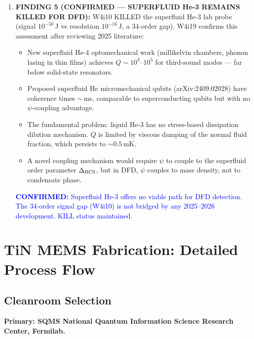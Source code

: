 \documentclass[11pt]{article}
\theoremstyle{remark}
\newcommand{\confirmed}[1]{\textcolor{blue}{\textbf{CONFIRMED:} #1}}
\begin{document}
\begin{tcolorbox}[colback=blue!5!white, colframe=blue!50!black,
  title=\textbf{W4i19 TOP 5 FINDINGS --- Ranked by Programme Impact}]
\begin{enumerate}
\item \textbf{FINDING 5 (CONFIRMED --- SUPERFLUID He-3 REMAINS KILLED FOR DFD):}
W4i10 KILLED the superfluid He-3 lab probe (signal $10^{-50}$\,J vs
resolution $10^{-16}$\,J, a 34-order gap). W4i19 confirms this
assessment after reviewing 2025 literature:
\begin{itemize}[nosep]
  \item New superfluid He-4 optomechanical work (millikelvin chambers,
    phonon lasing in thin films) achieves $Q \sim 10^3$--$10^5$
    for third-sound modes --- far below solid-state resonators.
  \item Proposed superfluid He micromechanical qubits
    (arXiv:2409.02028) have coherence times $\sim$\,ms, comparable
    to superconducting qubits but with no $\psi$-coupling advantage.
  \item The fundamental problem: liquid He-3 has no stress-based
    dissipation dilution mechanism. $Q$ is limited by viscous damping
    of the normal fluid fraction, which persists to $\sim 0.5$\,mK.
  \item A novel coupling mechanism would require $\psi$ to couple to
    the superfluid order parameter $\Delta_{\rm BCS}$, but in DFD,
    $\psi$ couples to mass density, not to condensate phase.
\end{itemize}
\confirmed{Superfluid He-3 offers no viable path for DFD detection.
The 34-order signal gap (W4i10) is not bridged by any 2025--2026
development. KILL status maintained.}

\end{enumerate}
\end{tcolorbox}


\section{TiN MEMS Fabrication: Detailed Process Flow}
\label{sec:process_flow}

\subsection{Cleanroom Selection}

\textbf{Primary: SQMS National Quantum Information Science Research
Center, Fermilab.}
\end{document}
